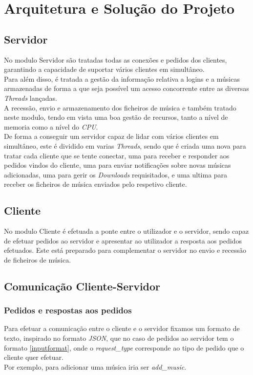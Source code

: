 \documentclass[a4paper]{report}
\begin{document}
\chapter{Arquitetura e Solução do Projeto}
\section{Servidor}
No modulo Servidor são tratadas todas as conexões e pedidos dos clientes,
garantindo a capacidade de suportar vários clientes em simultâneo.\\
Para além disso, é tratada a gestão da informação relativa a logins e a
músicas armazenadas de forma a que seja possível um acesso concorrente entre as
diversas \textit{Threads} lançadas.\\
A recessão, envio e armazenamento dos ficheiros de música e também tratado neste
modulo, tendo em vista uma boa gestão de recursos, tanto a nível de memoria
como a nível do \textit{CPU}.\\
De forma a conseguir um servidor capaz de lidar com vários clientes em
simultâneo, este é dividido em varias \textit{Threads}, sendo que é criada uma
nova para tratar cada cliente que se tente conectar, uma para receber e
responder aos pedidos vindos do cliente, uma para enviar notificações sobre
novas músicas adicionadas, uma para gerir os \textit{Downloads} requisitados, e
uma ultima para receber os ficheiros de música enviados pelo respetivo cliente.

\section{Cliente}
No modulo Cliente é efetuada a ponte entre o utilizador e o servidor, sendo 
capaz de efetuar pedidos ao servidor e apresentar ao utilizador a resposta aos
pedidos efetuados. Este está preparado para complementar o servidor no envio e
recessão de ficheiros de música.

\section{Comunicação Cliente-Servidor}
\subsection{Pedidos e respostas aos pedidos}
Para efetuar a comunicação entre o cliente e o servidor fixamos
um formato de texto, inspirado no formato \textit{JSON}, que no caso
de pedidos ao servidor tem o formato \ref{inputformat}, onde o 
\textit{request\_type} corresponde ao tipo de pedido que o cliente quer
efetuar.\\
Por exemplo, para adicionar uma música iria ser \textit{add\_music}.\\
\end{document}
